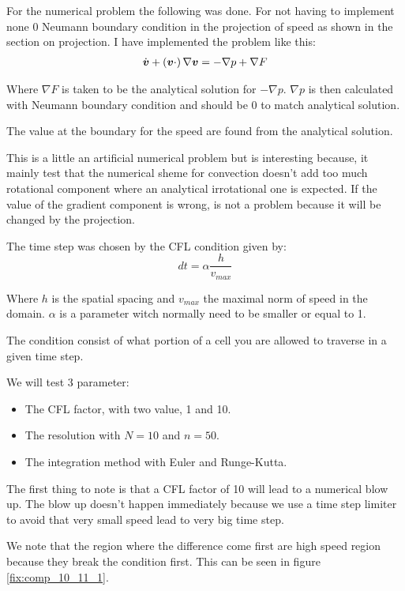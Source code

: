 For the numerical problem the following was done.
For not having to implement none 0 Neumann boundary condition in the projection of speed as shown in the section on projection.
I have implemented the problem like this:
\begin{align}
	\dot{{\boldsymbol {v}}}+ \left({\boldsymbol {v}}\cdot\right) \nabla {\boldsymbol {v}}&=-\nabla p+\nabla F\\
\end{align}

Where $\nabla F$ is taken to be the analytical solution for $-\nabla p$.
$\nabla p$ is then calculated with Neumann boundary condition and should be 0 to match analytical solution.

The value at the boundary for the speed are found from the analytical solution.

This is a little an artificial numerical problem but is interesting because,
it mainly test that the numerical sheme for convection doesn't add too much rotational component
where an analytical irrotational one is expected. If the value of the gradient component is wrong, is not a problem
because it will be changed by the projection.

The time step was chosen by the CFL condition given by:
\begin{equation}
  dt=\alpha \frac{h}{v_{max}}
\end{equation}

Where $h$ is the spatial spacing and $v_{max}$ the maximal norm of speed in the domain.
$\alpha$ is a parameter witch normally need to be smaller or equal to 1.

The condition consist of what portion of a cell you are allowed to traverse in a given time step.

We will test 3 parameter:
\begin{itemize}
	\item The CFL factor, with two value, 1 and 10.
	\item The resolution with $N=10$ and $n=50$.
	\item The integration method with Euler and Runge-Kutta.
\end{itemize}
 
The first thing to note is that a CFL factor of 10 will lead to a numerical blow up.
The blow up doesn't happen immediately because we use a time step limiter to avoid that very small speed lead to very big time step.

We note that the region where the difference come first are high speed region because they break the condition first.
This can be seen in figure \ref{fix:comp_10_11_1}.

